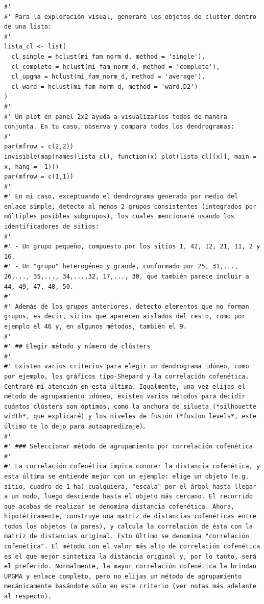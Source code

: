\documentclass[11pt,]{article}
\begin{document}
\begin{verbatim}
#'
#' Para la exploración visual, generaré los objetos de cluster dentro de una lista:
#' 
lista_cl <- list(
  cl_single = hclust(mi_fam_norm_d, method = 'single'),
  cl_complete = hclust(mi_fam_norm_d, method = 'complete'),
  cl_upgma = hclust(mi_fam_norm_d, method = 'average'),
  cl_ward = hclust(mi_fam_norm_d, method = 'ward.D2')
)
#' 
#' Un plot en panel 2x2 ayuda a visualizarlos todos de manera conjunta. En tu caso, observa y compara todos los dendrogramas:
#' 
par(mfrow = c(2,2))
invisible(map(names(lista_cl), function(x) plot(lista_cl[[x]], main = x, hang = -1)))
par(mfrow = c(1,1))
#' 
#' En mi caso, exceptuando el dendrograma generado por medio del enlace simple, detecto al menos 2 grupos consistentes (integrados por múltiples posibles subgrupos), los cuales mencionaré usando los identificadores de sitios:
#' 
#' - Un grupo pequeño, compuesto por los sitios 1, 42, 12, 21, 11, 2 y 16.
#' - Un "grupo" heterogéneo y grande, conformado por 25, 31,..., 26,..., 35,..., 34,...,32, 17,..., 30, que también parece incluir a 44, 49, 47, 48, 50.
#' 
#' Además de los grupos anteriores, detecto elementos que no forman grupos, es decir, sitios que aparecen aislados del resto, como por ejemplo el 46 y, en algunos métodos, también el 9.
#' 
#' ## Elegir método y número de clústers
#' 
#' Existen varios criterios para elegir un dendrograma idóneo, como por ejemplo, los gráficos tipo-Shepard y la correlación cofenética. Centraré mi atención en esta última. Igualmente, una vez elijas el método de agrupamiento idóneo, existen varios métodos para decidir cuántos clústers son óptimos, como la anchura de silueta (*silhouette width*, que explicaré) y los niveles de fusión (*fusion levels*, este último te lo dejo para autoapredizaje).
#' 
#' ### Seleccionar método de agrupamiento por correlación cofenética
#' 
#' La correlación cofenética impica conocer la distancia cofenética, y esta última se entiende mejor con un ejemplo: elige un objeto (e.g. sitio, cuadro de 1 ha) cualquiera, "escala" por el árbol hasta llegar a un nodo, luego desciende hasta el objeto más cercano. El recorrido que acabas de realizar se denomina distancia cofenética. Ahora, hipotéticamente, construye una matriz de distancias cofenéticas entre todos los objetos (a pares), y calcula la correlación de ésta con la matriz de distancias original. Esto último se denomina "correlación cofenética". El método con el valor más alto de correlación cofenética es el que mejor sintetiza la distancia original y, por lo tanto, será el preferido. Normalmente, la mayor correlación cofenética la brindan UPGMA y enlace completo, pero no elijas un método de agrupamiento mecánicamente basándote sólo en este criterio (ver notas más adelante al respecto).

\end{verbatim}
\end{document}
